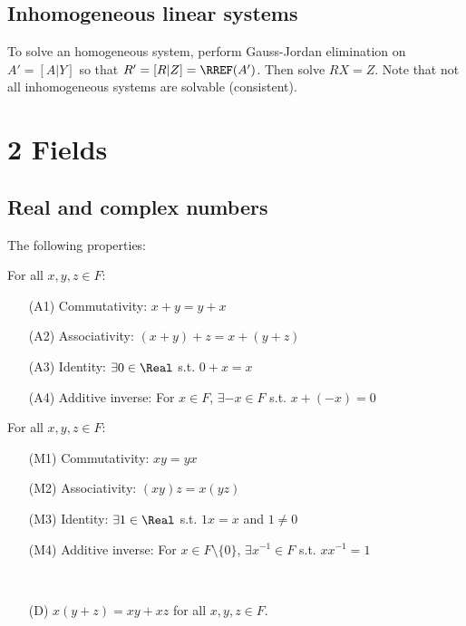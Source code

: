 \subsection{Inhomogeneous linear systems}

\begin{procedure}[Solution] To solve an homogeneous system, perform Gauss-Jordan elimination on $A' = [A|Y]$ so that $R' = [R|Z] = \RREF(A')$. Then solve $RX = Z$. Note that not all inhomogeneous systems are solvable (consistent).
\end{procedure}


\columnbreak

\section*{2 Fields}

\subsection{Real and complex numbers}

\begin{definition}
  The following properties:

\begin{theorem}
  For all $x, y, z \in F$:
  \begin{itemize}
    \item[(A1)] Commutativity: $x + y = y + x$ 
    \item[(A2)] Associativity: $(x + y) + z = x + (y + z)$
    \item[(A3)] Identity: $\exists 0 \in \Real$ s.t. $0 + x = x$
    \item[(A4)] Additive inverse: For $x \in F$, $\exists -x \in F$ s.t. $x + (-x) = 0$
  \end{itemize}
\end{theorem}

\begin{theorem}
  For all $x, y, z \in F$:
  \begin{itemize}
    \item[(M1)] Commutativity: $xy = yx$ 
    \item[(M2)] Associativity: $(xy)z = x(yz)$
    \item[(M3)] Identity: $\exists 1 \in \Real$ s.t. $1x = x$ and $1 \neq 0$
    \item[(M4)] Additive inverse: For $x \in F \setminus \{ 0 \}$, $\exists x^{-1} \in F$ s.t. $xx^{-1} = 1$
  \end{itemize}
\end{theorem}

\begin{theorem} \ \\
  \begin{itemize}
    \item[(D)] $x(y + z) = xy + xz$ for all $x, y, z \in F$.
  \end{itemize}
\end{theorem}
\end{definition}

